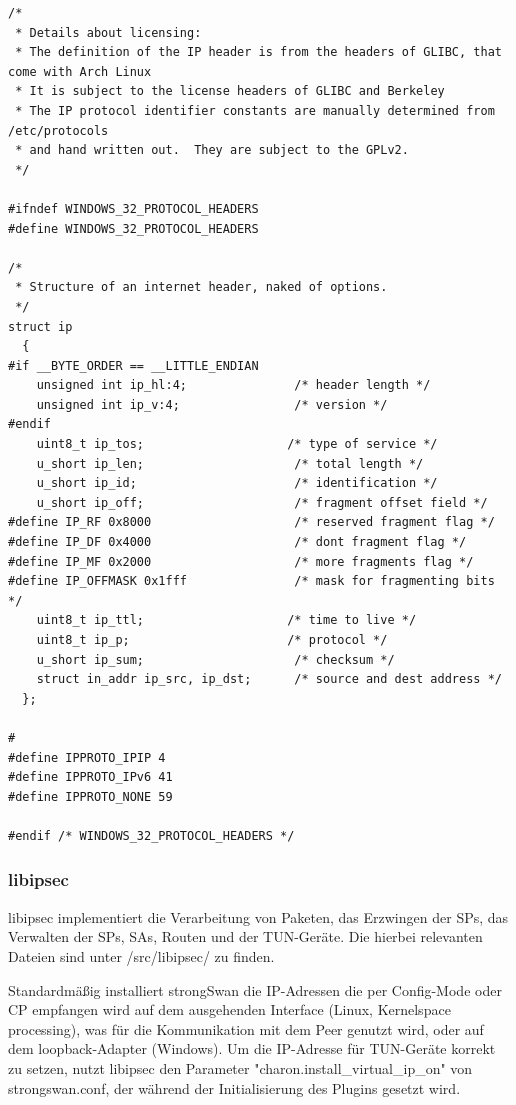 \begin{lstlisting}[caption=Header für libipsec]
/*
 * Details about licensing:
 * The definition of the IP header is from the headers of GLIBC, that come with Arch Linux
 * It is subject to the license headers of GLIBC and Berkeley
 * The IP protocol identifier constants are manually determined from /etc/protocols
 * and hand written out.  They are subject to the GPLv2.
 */

#ifndef WINDOWS_32_PROTOCOL_HEADERS
#define WINDOWS_32_PROTOCOL_HEADERS

/*
 * Structure of an internet header, naked of options.
 */
struct ip
  {
#if __BYTE_ORDER == __LITTLE_ENDIAN
    unsigned int ip_hl:4;               /* header length */
    unsigned int ip_v:4;                /* version */
#endif
    uint8_t ip_tos;                    /* type of service */
    u_short ip_len;                     /* total length */
    u_short ip_id;                      /* identification */
    u_short ip_off;                     /* fragment offset field */
#define IP_RF 0x8000                    /* reserved fragment flag */
#define IP_DF 0x4000                    /* dont fragment flag */
#define IP_MF 0x2000                    /* more fragments flag */
#define IP_OFFMASK 0x1fff               /* mask for fragmenting bits */
    uint8_t ip_ttl;                    /* time to live */
    uint8_t ip_p;                      /* protocol */
    u_short ip_sum;                     /* checksum */
    struct in_addr ip_src, ip_dst;      /* source and dest address */
  };

# 
#define IPPROTO_IPIP 4
#define IPPROTO_IPv6 41
#define IPPROTO_NONE 59

#endif /* WINDOWS_32_PROTOCOL_HEADERS */
\end{lstlisting}

\subsubsection{libipsec}
libipsec implementiert die Verarbeitung von Paketen, das Erzwingen der \acp{SP},
das Verwalten der \acp{SP}, \acp{SA}, Routen und der TUN-Geräte.
Die hierbei relevanten Dateien sind unter /src/libipsec/ zu finden.

Standardmäßig installiert strongSwan die IP-Adressen die per Config-Mode
oder \ac{CP} empfangen wird auf dem ausgehenden Interface (Linux, Kernelspace processing),
was für die Kommunikation mit dem Peer genutzt wird,
oder auf dem loopback-Adapter (Windows).
Um die IP-Adresse für TUN-Geräte korrekt zu setzen, nutzt libipsec den Parameter
"charon.install\_virtual\_ip\_on" von strongswan.conf, der während der Initialisierung
des Plugins gesetzt wird.
